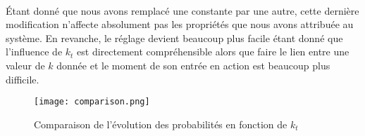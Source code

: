 \paragraph{}
Étant donné que nous avons remplacé une constante par une autre, cette
dernière modification n'affecte absolument pas les propriétés que nous avons
attribuée au système. En revanche, le réglage devient beaucoup plus facile
étant donné que l'influence de $k_t$ est directement compréhensible alors
que faire le lien entre une valeur de $k$ donnée et le moment de son entrée en
action est beaucoup plus difficile.


\begin{figure}[H]
  \caption{Comparaison de l'évolution des probabilités en fonction de $k_t$}
  \texttt{[image: comparison.png]}
\end{figure}
